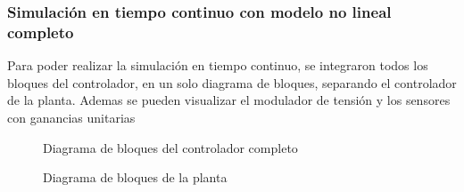 \documentclass[a4paper, 10pt, onecolumn,journal]{ieeeconf}
\begin{document}
\subsubsection{\textbf{Simulación en tiempo continuo con modelo no lineal completo}}
Para poder realizar la simulación en tiempo continuo, se integraron todos los bloques del controlador, en un solo diagrama de bloques, separando el controlador de la planta. Ademas se pueden visualizar el modulador de tensión y los sensores con ganancias unitarias 
\begin{figure}[H]
	\centering
	\begin{adjustbox}{max width=\columnwidth}
	\end{adjustbox}
	\caption{Diagrama de bloques del controlador completo}
	\label{Diagrama de bloques del controlador completo}
\end{figure}
\begin{figure}[H]
	\centering
	\begin{adjustbox}{max width=\columnwidth}
	\end{adjustbox}
	\caption{Diagrama de bloques de la planta}
	\label{Diagrama de bloques de la planta}
\end{figure}
\end{document}

